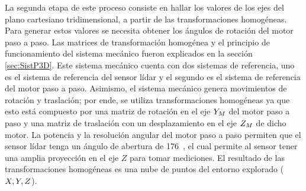 La segunda etapa de este proceso consiste en hallar los valores de los ejes del plano cartesiano 
tridimensional, a partir de las transformaciones homogéneas. Para generar estos 
valores se necesita obtener los ángulos de rotación del motor paso a paso. Las matrices
de transformación homogénea y el principio de funcionamiento del sistema mecánico fueron
explicados en la sección \ref{sec:SistP3D}. Este sistema mecánico cuenta con dos sistemas
de referencia, uno es el sistema de referencia del sensor lídar y el segundo es el sistema
de referencia del motor paso a paso. Asimismo, el sistema mecánico genera movimientos de 
rotación y traslación; por ende, se utiliza transformaciones homogéneas ya que esto 
está compuesto por una matriz de rotación en el eje $\mathnormal Y_{M}$ del motor paso a paso y
una matriz de traslación con un desplazamiento en el eje $\mathnormal Z_{M}$ de dicho motor. La potencia
y la resolución angular del motor paso a paso permiten que el sensor lídar tenga un ángulo de 
abertura de 176\grad~, el cual permite al sensor tener una amplia proyección en el eje $Z$ para
tomar mediciones. El resultado de las transformaciones homogéneas es una nube de puntos del
entorno explorado ($\mathnormal X, \mathnormal Y, \mathnormal Z$).


